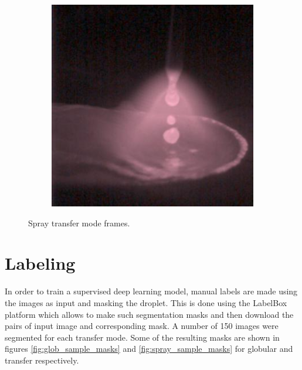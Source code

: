 \begin{figure}[htbp]
\begin{subfigure}[b]{0.3\textwidth}
        \caption{}
    \end{subfigure}
\hfill
    \begin{subfigure}[b]{0.3\textwidth}
        \includegraphics[width=\linewidth]{Images/Dataset/spray_sample_484.jpg}
        \caption{}
    \end{subfigure}

    \caption[Spray transfer mode frames]{Spray transfer mode frames.}
    \label{fig:spray_samples}
\end{figure}

\section{Labeling}
In order to train a supervised deep learning model, manual labels are made using the images as input and masking the droplet. This is done using the LabelBox platform which allows to make such segmentation masks and then download the pairs of input image and corresponding mask. A number of 150 images were segmented for each transfer mode. Some of the resulting masks are shown in figures \ref{fig:glob_sample_masks} and \ref{fig:spray_sample_masks} for globular and transfer respectively.

